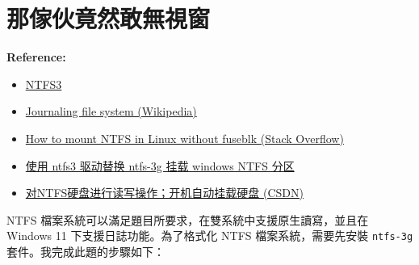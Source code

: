 \documentclass[12pt]{article}
\newenvironment{mycolorbox}[1][gray]{
  \renewmdenv[
    linewidth=2pt, linecolor=#1, backgroundcolor=#1!10,
    topline=false, bottomline=false, rightline=false,
    skipabove=10pt, skipbelow=10pt, innerleftmargin=10pt,
    innerrightmargin=0pt, innertopmargin=5pt, innerbottommargin=5pt
  ]{myquote}
  \begin{myquote}
}{\end{myquote}}
\begin{document}
\section{那傢伙竟然敢無視窗}

\begin{mycolorbox}[teal]
  \textbf{Reference:}
  \footnotesize
  \begin{itemize}
    \item \href{https://docs.kernel.org/filesystems/ntfs3.html}{NTFS3}
    \item \href{https://en.wikipedia.org/wiki/Journaling_file_system}{Journaling file system (Wikipedia)}
    \item \href{https://stackoverflow.com/questions/73065519/how-to-mount-ntfs-in-linux-without-fuseblk}{How to mount NTFS in Linux without fuseblk (Stack Overflow)}
    \item \href{https://www.insidentally.com/articles/000029/}{使用 ntfs3 驱动替换 ntfs-3g 挂载 windows NTFS 分区}
    \item \href{https://blog.csdn.net/weixin_43801670/article/details/125105727}{对NTFS硬盘进行读写操作；开机自动挂载硬盘 (CSDN)}
  \end{itemize}
\end{mycolorbox}

NTFS 檔案系統可以滿足題目所要求，在雙系統中支援原生讀寫，並且在 Windows 11 下支援日誌功能。為了格式化 NTFS 檔案系統，需要先安裝 \texttt{ntfs-3g} 套件。我完成此題的步驟如下：
\end{document}
